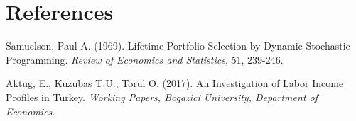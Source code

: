 \chapter*{References}

\begin{description}

\item Samuelson, Paul A. (1969). Lifetime Portfolio Selection by Dynamic Stochastic Programming. \textit{Review of Economics and Statistics}, 51, 239-246.
 
\item Aktug, E., Kuzubas T.U., Torul O. (2017). An Investigation of Labor Income Profiles in Turkey. \textit{Working Papers, Bogazici University, Department of Economics}.

\end{description}
